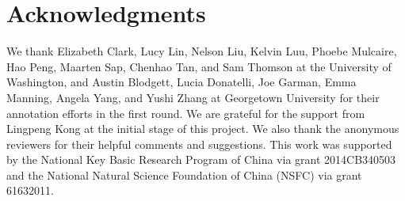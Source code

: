 \documentclass[11pt,a4paper]{article}
\newcommand{\nss}[1]{\textcolor{magenta}{[$_\mathrm{S}^\mathrm{NS}$#1]}}
\begin{document}
\section*{Acknowledgments}
We thank Elizabeth Clark, Lucy Lin, Nelson Liu, Kelvin Luu, Phoebe Mulcaire, 
Hao Peng, Maarten Sap, Chenhao Tan, and Sam Thomson at the University of Washington, 
and Austin Blodgett, Lucia Donatelli, Joe Garman, Emma Manning, Angela Yang, and Yushi Zhang 
at Georgetown University for their annotation efforts in the first round.
We are grateful for the support from Lingpeng Kong at the initial stage of this project.
We also thank the anonymous reviewers for their helpful comments and suggestions.
This work was supported by the National Key Basic Research
Program of China via grant 2014CB340503 and the
National Natural Science Foundation of China (NSFC) via
grant 61632011.




\end{document}

